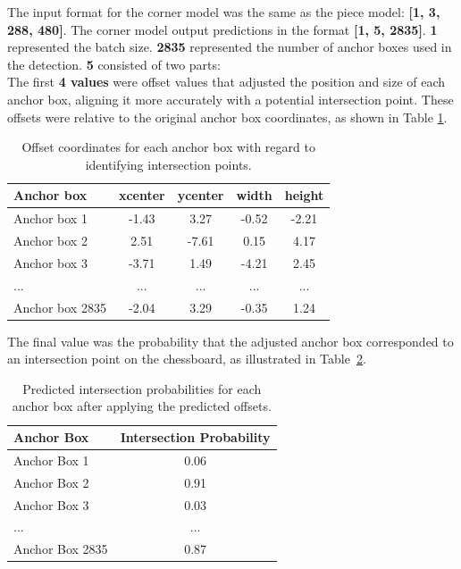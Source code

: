 The input format for the corner model was the same as the piece model: \textbf{[1, 3, 288, 480]}. The corner model output predictions in the format \textbf{[1, 5, 2835]}. \textbf{1} represented the batch size. \textbf{2835} represented the number of anchor boxes used in the detection. \textbf{5} consisted of two parts: \\

The first \textbf{4 values} were offset values that adjusted the position and size of each anchor box, aligning it more accurately with a potential intersection point. These offsets were relative to the original anchor box coordinates, as shown in Table \ref{tab:corner-offset-table}.

\newpage

\begin{table}[h]
    \centering
    \caption{Offset coordinates for each anchor box with regard to identifying intersection points.}  %
    \renewcommand{\arraystretch}{1.5} %
    \begin{tabular}{lcccc}
        \toprule
        \textbf{Anchor box} & \textbf{xcenter} & \textbf{ycenter} & \textbf{width} & \textbf{height} \\
        \midrule
        Anchor box 1 & -1.43 & 3.27 & -0.52 & -2.21 \\
        Anchor box 2 & 2.51 & -7.61 & 0.15 & 4.17 \\
        Anchor box 3 & -3.71 & 1.49 & -4.21 & 2.45 \\
        ... & ... & ... & ... & ... \\
        Anchor box 2835 & -2.04 & 3.29 & -0.35 & 1.24 \\
        \bottomrule
    \end{tabular}
    \label{tab:corner-offset-table}
\end{table}

The final value was the probability that the adjusted anchor box corresponded to an intersection point on the chessboard, as illustrated in Table~\ref{tab:corner-probability-table}. \\

\begin{table}[h]
    \centering
    \caption{Predicted intersection probabilities for each anchor box after applying the predicted offsets.}
    \renewcommand{\arraystretch}{1.5}
    \begin{tabular}{lc}
        \toprule
        \textbf{Anchor Box} & \textbf{Intersection Probability} \\
        \midrule
        Anchor Box 1 & 0.06 \\
        Anchor Box 2 & 0.91 \\
        Anchor Box 3 & 0.03 \\
        ... & ... \\
        Anchor Box 2835 & 0.87 \\
        \bottomrule
    \end{tabular}
    \label{tab:corner-probability-table}
\end{table}



